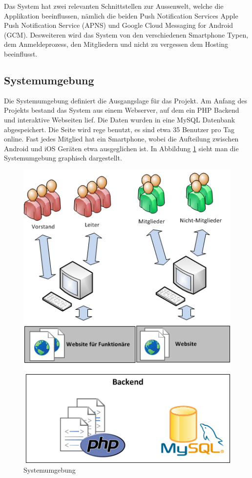 Das System hat zwei relevanten Schnittstellen zur Aussenwelt, welche die Applikation beeinflussen, nämlich die beiden Push Notification Services Apple Push Notification Service (APNS) und Google Cloud Messaging for Android (GCM). Desweiteren wird das System von den verschiedenen Smartphone Typen, dem Anmeldeprozess, den Mitgliedern und nicht zu vergessen dem Hosting beeinflusst.

\subsection{Systemumgebung}\label{systemumgebung}
Die Systemumgebung definiert die Ausgangslage für das Projekt. Am Anfang des Projekts bestand das System aus einem Webserver, auf dem ein PHP Backend und interaktive Webseiten lief. Die Daten wurden in eine MySQL Datenbank abgespeichert. Die Seite wird rege benutzt, es sind etwa 35 Benutzer pro Tag online. Fast jedes Mitglied hat ein Smartphone, wobei die Aufteilung zwischen Android und iOS Geräten etwa ausgeglichen ist. In Abbildung \ref{fig:systemumgebung} sieht man die Systemumgebung graphisch dargestellt.
\begin{figure}[h]
\centering
\includegraphics[scale=0.8]{images/visio/systemumgebung.png}
\caption{Systemumgebung}
\label{fig:systemumgebung}
\end{figure}

